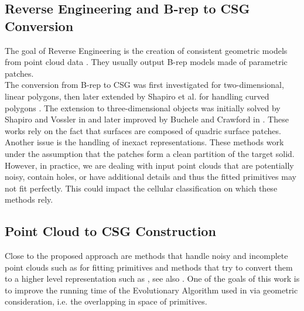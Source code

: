 \subsection{Reverse Engineering and B-rep to CSG Conversion}
The goal of Reverse Engineering is the creation of consistent geometric models from point cloud data \cite{VMC97,BMV01}. 
They usually output B-rep models made of parametric patches.
\\
The conversion from B-rep to CSG was first investigated 
for two-dimensional, linear polygons, then 
later extended by Shapiro et al. for handling curved polygons \cite{shapiro1991efficient, shapiro2001convex}. 
The extension to three-dimensional objects was initially solved 
by Shapiro and Vossler in 
\cite{shapiro1991construction, shapiro1993separation} 
and later improved by 
Buchele and Crawford in \cite{buchele2004three}. 
These works rely on the fact that surfaces are composed of quadric surface patches. 
Another issue is the handling of inexact representations. 
These methods work under the assumption that the patches form a clean partition of the 
target solid. However, in practice, we are dealing with input point clouds that are potentially 
noisy, contain holes, or have additional details and thus the fitted primitives may not fit perfectly. 
This could impact the cellular classification on which these methods rely. 

\subsection{Point Cloud to CSG Construction}
Close to the proposed approach are methods that handle noisy and incomplete point clouds 
such as \cite{schnabel2007efficient} for fitting primitives and methods that try to convert them to a higher level representation such as \cite{fayolle2016evolutionary}, see also \cite[Sections~7 and 8]{berger2017survey}. 
One of the goals of this work is to improve the running time of the Evolutionary Algorithm used in \cite{fayolle2016evolutionary} via geometric consideration, i.e. the overlapping in space of primitives.

